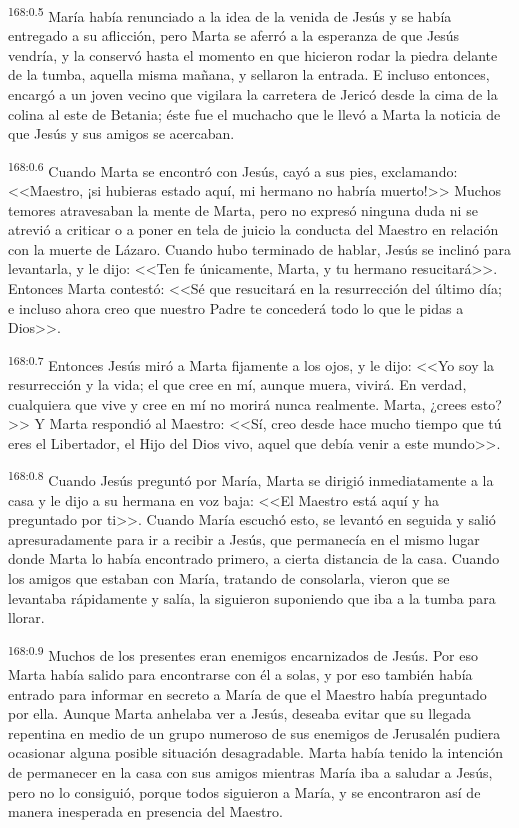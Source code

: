 \par 
\textsuperscript{168:0.5} María había renunciado a la idea de la venida de Jesús y se había entregado a su aflicción, pero Marta se aferró a la esperanza de que Jesús vendría, y la conservó hasta el momento en que hicieron rodar la piedra delante de la tumba, aquella misma mañana, y sellaron la entrada. E incluso entonces, encargó a un joven vecino que vigilara la carretera de Jericó desde la cima de la colina al este de Betania; éste fue el muchacho que le llevó a Marta la noticia de que Jesús y sus amigos se acercaban.

\par 
\textsuperscript{168:0.6} Cuando Marta se encontró con Jesús, cayó a sus pies, exclamando: <<Maestro, ¡si hubieras estado aquí, mi hermano no habría muerto!>> Muchos temores atravesaban la mente de Marta, pero no expresó ninguna duda ni se atrevió a criticar o a poner en tela de juicio la conducta del Maestro en relación con la muerte de Lázaro. Cuando hubo terminado de hablar, Jesús se inclinó para levantarla, y le dijo: <<Ten fe únicamente, Marta, y tu hermano resucitará>>. Entonces Marta contestó: <<Sé que resucitará en la resurrección del último día; e incluso ahora creo que nuestro Padre te concederá todo lo que le pidas a Dios>>.

\par 
\textsuperscript{168:0.7} Entonces Jesús miró a Marta fijamente a los ojos, y le dijo: <<Yo soy la resurrección y la vida; el que cree en mí, aunque muera, vivirá. En verdad, cualquiera que vive y cree en mí no morirá nunca realmente. Marta, ¿crees esto?>> Y Marta respondió al Maestro: <<Sí, creo desde hace mucho tiempo que tú eres el Libertador, el Hijo del Dios vivo, aquel que debía venir a este mundo>>.

\par 
\textsuperscript{168:0.8} Cuando Jesús preguntó por María, Marta se dirigió inmediatamente a la casa y le dijo a su hermana en voz baja: <<El Maestro está aquí y ha preguntado por ti>>. Cuando María escuchó esto, se levantó en seguida y salió apresuradamente para ir a recibir a Jesús, que permanecía en el mismo lugar donde Marta lo había encontrado primero, a cierta distancia de la casa. Cuando los amigos que estaban con María, tratando de consolarla, vieron que se levantaba rápidamente y salía, la siguieron suponiendo que iba a la tumba para llorar.

\par 
\textsuperscript{168:0.9} Muchos de los presentes eran enemigos encarnizados de Jesús. Por eso Marta había salido para encontrarse con él a solas, y por eso también había entrado para informar en secreto a María de que el Maestro había preguntado por ella. Aunque Marta anhelaba ver a Jesús, deseaba evitar que su llegada repentina en medio de un grupo numeroso de sus enemigos de Jerusalén pudiera ocasionar alguna posible situación desagradable. Marta había tenido la intención de permanecer en la casa con sus amigos mientras María iba a saludar a Jesús, pero no lo consiguió, porque todos siguieron a María, y se encontraron así de manera inesperada en presencia del Maestro.

